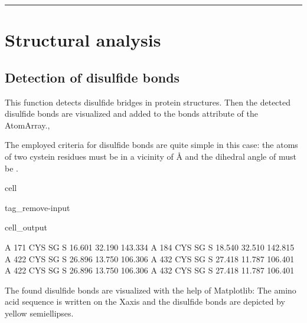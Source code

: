 \documentclass[letterpaper,10pt,english]{jupyterBook}
\begin{document}
\bigskip\hrule\bigskip


\sphinxstepscope


\chapter{Structural analysis}
\label{\detokenize{ipynb/chapter3:structural-analysis}}\label{\detokenize{ipynb/chapter3::doc}}

\section{Detection of disulfide bonds}
\label{\detokenize{ipynb/chapter3:detection-of-disulfide-bonds}}
\sphinxAtStartPar
This function detects disulfide bridges in protein structures. Then the detected disulfide bonds are visualized and added to the bonds attribute of the AtomArray.,

\sphinxAtStartPar
The employed criteria for disulfide bonds are quite simple in this case: the atoms of two cystein residues must be in a vicinity of Å and the dihedral angle of must be .

\begin{sphinxuseclass}{cell}
\begin{sphinxuseclass}{tag_remove-input}\begin{sphinxVerbatimOutput}

\begin{sphinxuseclass}{cell_output}
\begin{sphinxVerbatim}[commandchars=\\\{\}]
    A     171  CYS SG     S        16.601   32.190  143.334
    A     184  CYS SG     S        18.540   32.510  142.815
    A     422  CYS SG     S        26.896   13.750  106.306
    A     432  CYS SG     S        27.418   11.787  106.401
    A     422  CYS SG     S        26.896   13.750  106.306
    A     432  CYS SG     S        27.418   11.787  106.401
\end{sphinxVerbatim}

\end{sphinxuseclass}\end{sphinxVerbatimOutput}

\end{sphinxuseclass}
\end{sphinxuseclass}
\sphinxAtStartPar
The found disulfide bonds are visualized with the help of Matplotlib: The amino acid sequence is written on the X\sphinxhyphen{}axis and the disulfide bonds are depicted by yellow semi\sphinxhyphen{}ellipses.
\end{document}
